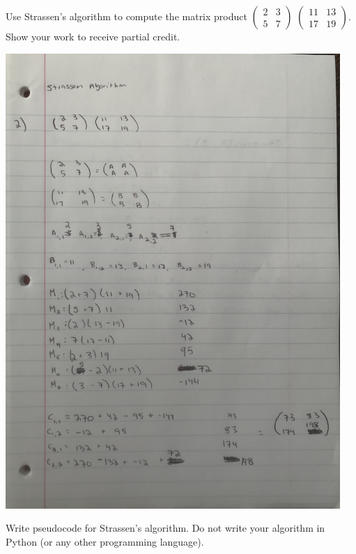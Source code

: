 \documentclass[addpoints,11pt]{exam}
\begin{document}
\begin{questions}
\ifprintanswers
\newpage
\else
\bigskip
\fi


\question[8] Use Strassen's algorithm to compute the matrix product
$\begin{pmatrix}
	2 & 3\\
	5 & 7
\end{pmatrix}
$
$\begin{pmatrix}
	11 & 13\\
	17 & 19
\end{pmatrix}
$.  Show your work to receive partial credit.
\begin{solutionorbox}
\includegraphics[width=5in]{no2}
\end{solutionorbox}

\ifprintanswers
\newpage
\else
\bigskip
\fi


\question[10] Write pseudocode for Strassen's algorithm.  Do not write your algorithm in Python (or any other programming language).
\begin{solutionorbox}
	

\end{solutionorbox}
\end{questions}
\end{document}

